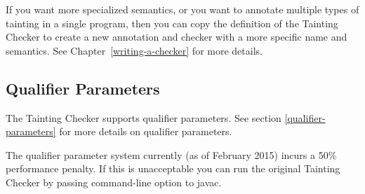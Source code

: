 If you want more specialized semantics, or you want to annotate multiple
types of tainting in a single program, then you can copy the definition of
the Tainting Checker to create a new annotation and checker with a more
specific name and semantics.  See Chapter~\ref{writing-a-checker} for more
details.

\subsection{Qualifier Parameters\label{tainting-qual-params}}
The Tainting Checker supports qualifier parameters.
See section \ref{qualifier-parameters} for more details on qualifier parameters.

The qualifier parameter system currently (as of February 2015)
incurs a 50\% performance penalty. If this is unacceptable you can run the
original Tainting Checker by passing 
command-line option to javac.


